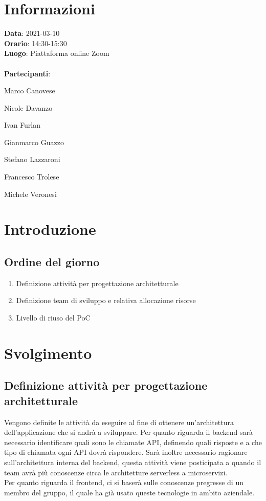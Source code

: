 \section{Informazioni}
\textbf{Data}: 2021-03-10 \\
\textbf{Orario}: 14:30-15:30 \\
\textbf{Luogo}: Piattaforma online Zoom \\\\
\textbf{Partecipanti}:\begin{list}{*}{\setlength{\itemsep}{0cm}}
	\item Marco Canovese
	\item Nicole Davanzo
	\item Ivan Furlan
	\item Gianmarco Guazzo
	\item Stefano Lazzaroni
	\item Francesco Trolese
	\item Michele Veronesi
\end{list}
\section{Introduzione}
\subsection{Ordine del giorno}
\begin{enumerate}
	\item Definizione attività per progettazione architetturale
	\item Definizione team di sviluppo e relativa allocazione risorse
	\item Livello di riuso del PoC
\end{enumerate}

\section{Svolgimento}
\subsection{Definizione attività per progettazione architetturale}
Vengono definite le attività da eseguire al fine di ottenere un'architettura dell'applicazione che si andrà a sviluppare.
Per quanto riguarda il backend sarà necessario identificare quali sono le chiamate API, definendo quali risposte e a che tipo di chiamata
ogni API dovrà rispondere. Sarà inoltre necessario ragionare sull'architettura interna del backend, questa attività viene posticipata a quando il team
avrà più conoscenze circa le architetture serverless a microservizi.\\
Per quanto riguarda il frontend, ci si baserà sulle conoscenze pregresse di un membro del gruppo, il quale ha già usato queste tecnologie in ambito aziendale.

